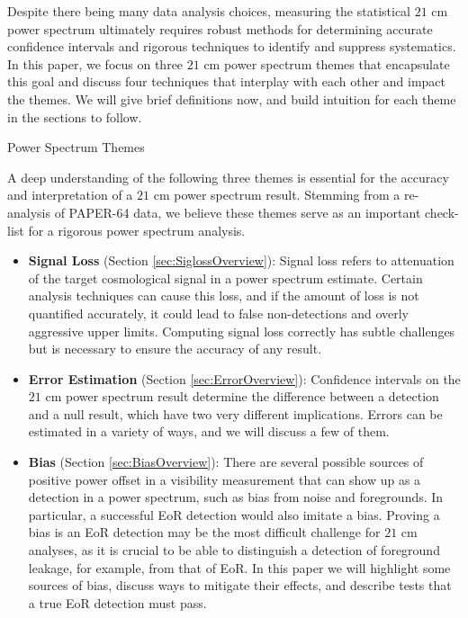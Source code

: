 \documentclass[preprint2,numberedappendix,tighten]{aastex6}  %
\begin{document}
Despite there being many data analysis choices, measuring the statistical $21$ cm power spectrum ultimately requires robust 
methods for determining accurate confidence intervals and rigorous techniques to identify and suppress systematics.  In this 
paper, we focus on three $21$ cm power spectrum themes that encapsulate this goal and discuss four techniques that interplay 
with each other and impact the themes. We will give brief definitions now, and build intuition for each theme in the sections to 
follow.

\begin{center}
Power Spectrum Themes
\end{center}

A deep understanding of the following three themes is essential for the accuracy and interpretation of a $21$ cm power 
spectrum result. Stemming from a re-analysis of PAPER-64 data, we believe these themes serve as an important check-list for 
a rigorous power spectrum analysis.
\begin{itemize}
\item \textbf{Signal Loss} (Section \ref{sec:SiglossOverview}): Signal loss refers to attenuation of the target cosmological signal 
in a power spectrum estimate. Certain analysis techniques can cause this loss, and if the amount of loss is not quantified accurately, it could lead to false non-detections and overly aggressive upper limits. Computing signal loss correctly has subtle challenges but is necessary to ensure the accuracy of any result. 
\item \textbf{Error Estimation} (Section \ref{sec:ErrorOverview}): Confidence intervals on the $21$ cm power spectrum result 
determine the difference between a detection and a null result, which have two very different implications. Errors can be 
estimated in a variety of ways, and we will discuss a few of them.
\item \textbf{Bias} (Section \ref{sec:BiasOverview}): There are several possible sources of positive power offset in a visibility 
measurement that can show up as a detection in a power spectrum, such as bias from noise and foregrounds. In particular, a 
successful EoR detection would also imitate a bias. Proving a bias is an EoR detection may be the most difficult challenge for $21$ cm 
analyses, as it is crucial to be able to distinguish a detection of foreground leakage, for example, from that of EoR. In this paper 
we will highlight some sources of bias, discuss ways to mitigate their effects, and describe tests that a true EoR detection must 
pass.
\end{itemize}
\end{document}
